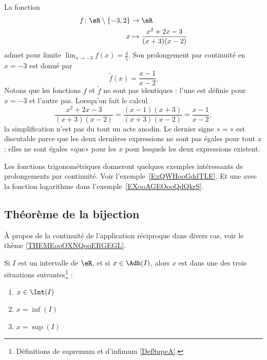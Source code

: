 \begin{example}
	La fonction
	\begin{equation}
		\begin{aligned}
			f\colon \eR\setminus\{ -3,2 \} & \to \eR                                  \\
			x                              & \mapsto  \frac{ x^2+2x-3 }{ (x+3)(x-2) }
		\end{aligned}
	\end{equation}
	admet pour limite \( \lim_{x\to -3} f(x)=\frac{ 4 }{ 5 }\). Son prolongement par continuité en \( x=-3\) est donné par
	\begin{equation}
		\tilde f(x)=\frac{ x-1 }{ x-2 }.
	\end{equation}
	Notons que les fonctions \( f\) et \( \tilde f\) ne sont pas identiques : l'une est définie pour \( x=-3\) et l'autre pas. Lorsqu'on fait le calcul
	\begin{equation}
		\frac{ x^2+2x-3 }{ (x+3)(x-2) }=\frac{ (x-1)(x+3) }{ (x+3)(x-2) }=\frac{ x-1 }{ x-2 },
	\end{equation}
	la simplification n'est pas du tout un acte anodin. Le dernier signe «\( =\)» est discutable parce que les deux dernières expressions ne sont pas égales pour tout \( x\); elles ne sont égales «que» pour les \( x\) pour lesquels les deux expressions existent.
\end{example}

Les fonctions trigonométriques donneront quelques exemples intéressants de prolongements par continuité. Voir l'exemple~\ref{ExQWHooGddTLE}. Et une avec la fonction logarithme dans l'exemple~\ref{EXooAGEOooQdQkrS}.

\subsection{Théorème de la bijection}

À propos de la continuité de l'application réciproque dans divers cas, voir le thème \ref{THEMEooOXNQooERGEGL}.

\begin{lemma}		\label{LEMooYUOOooByoQdr}
	Si \( I\) est un intervalle de \( \eR\), et si \( x\in \Adh(I)\), alors \( x\) est dans une des trois situations suivantes\footnote{Définitions de supremum et d'infimum \ref{DefSupeA}.} :
	\begin{enumerate}
		\item
		      \( x\in \Int(I)\)
		\item
		      \( x=\inf(I)\)
		\item
		      \( x=\sup(I)\)
	\end{enumerate}
\end{lemma}

